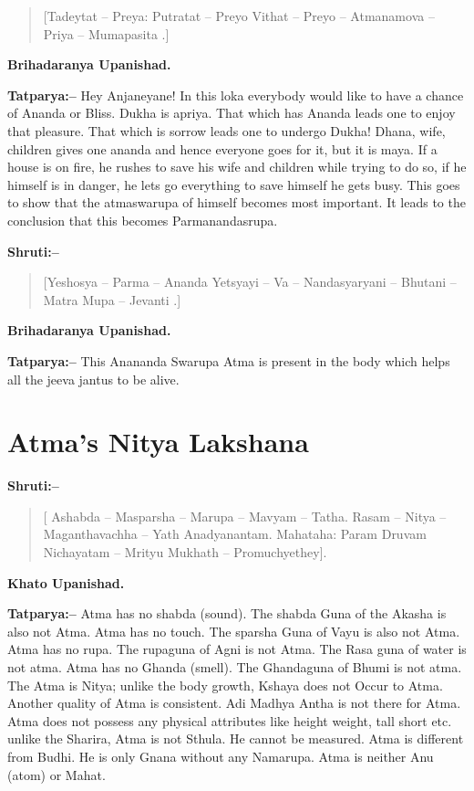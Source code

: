 \begin{verse}
[Tadeytat – Preya: Putratat – Preyo Vithat – Preyo – Atmanamova – Priya – Mumapasita .]
\end{verse}

\begin{flushright}
\textbf{Brihadaranya Upanishad.}
\end{flushright}

\textbf{Tatparya:–} Hey Anjaneyane! In this loka everybody would like to have a chance of Ananda or Bliss. Dukha is apriya. That which has Ananda leads one to enjoy that pleasure. That which is sorrow leads one to undergo Dukha! Dhana, wife, children gives one ananda and hence everyone goes for it, but it is maya. If a house is on fire, he rushes to save his wife and children while trying to do so, if he himself is in danger, he lets go everything to save himself he gets busy. This goes to show that the atmaswarupa of himself becomes most important. It leads to the conclusion that this becomes Parmanandasrupa.

\textbf{Shruti:–}

\begin{verse}
[Yeshosya – Parma – Ananda  Yetsyayi – Va – Nandasyaryani – Bhutani – Matra Mupa – Jevanti .]
\end{verse}

\begin{flushright}
\textbf{Brihadaranya Upanishad.}
\end{flushright}

\textbf{Tatparya:–} This Anananda Swarupa Atma is present in the body which helps all the jeeva jantus to be alive.

\chapter{Atma's Nitya Lakshana}

\textbf{Shruti:–}

\begin{verse}
[ Ashabda – Masparsha – Marupa – Mavyam – Tatha. Rasam – Nitya – Maganthavachha – Yath  Anadyanantam. Mahataha: Param Druvam Nichayatam – Mrityu Mukhath – Promuchyethey].
\end{verse}

\begin{flushright}
\textbf{Khato Upanishad.}
\end{flushright}

\textbf{Tatparya:–} Atma has no shabda (sound). The shabda Guna of the Akasha is also not Atma. Atma has no touch. The sparsha Guna of Vayu is also not Atma. Atma has no rupa. The rupaguna of Agni is not Atma. The Rasa guna of water is not atma. Atma has no Ghanda (smell). The Ghandaguna of Bhumi is not atma. The Atma is Nitya; unlike the body growth, Kshaya does not Occur to Atma. Another quality of Atma is consistent. Adi Madhya Antha is not there for Atma. Atma does not possess any physical attributes like height weight, tall short etc. unlike the Sharira, Atma is not Sthula. He cannot be measured. Atma is different from Budhi. He is only Gnana without any Namarupa. Atma is neither Anu (atom) or Mahat.

